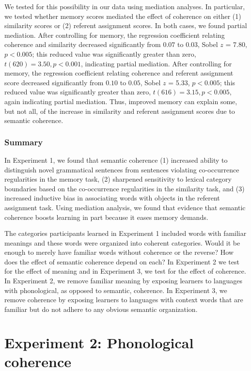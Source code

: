 \documentclass[man,floatsintext]{apa6}
\begin{document}
We tested for this possibility in our data using mediation analyses. In particular, we tested whether memory scores mediated the effect of coherence on either (1) similarity scores or (2) referent assignment scores. In both cases, we found partial mediation. After controlling for memory, the regression coefficient relating coherence and similarity decreased significantly from $0.07$ to $0.03$, Sobel $z$ = 7.80, $p < 0.005$; this reduced value was significantly greater than zero, $t(620) = 3.50, p < 0.001$, indicating partial mediation. After controlling for memory, the regression coefficient relating coherence and referent assignment score decreased significantly from $0.10$ to $0.05$, Sobel $z$ = 5.33, $p < 0.005$; this reduced value was significantly greater than zero, $t(616) = 3.15, p < 0.005$, again indicating partial mediation. Thus, improved memory can explain some, but not all, of the increase in similarity and referent assignment scores due to semantic coherence.

\subsubsection{Summary}

In Experiment 1, we found that semantic coherence (1) increased ability to distinguish novel grammatical sentences from sentences violating co-occurrence regularities in the memory task, (2) sharpened sensitivity to lexical category boundaries based on the co-occurrence regularities in the similarity task, and (3) increased inductive bias in associating words with objects in the referent assignment task. Using mediation analysis, we found that evidence that semantic coherence boosts learning in part because it eases memory demands.

The categories participants learned in Experiment 1 included words with familiar meanings and these words were organized into coherent categories. Would it be enough to merely have familiar words without coherence or the reverse? How does the effect of semantic coherence depend on each? In Experiment 2 we test for the effect of meaning and in Experiment 3, we test for the effect of coherence. In Experiment 2, we remove familiar meaning by exposing learners to languages with phonological, as opposed to semantic, coherence. In Experiment 3, we remove coherence by exposing learners to languages with context words that are familiar but do not adhere to any obvious semantic organization.

\section{Experiment 2: Phonological coherence}
\end{document}
